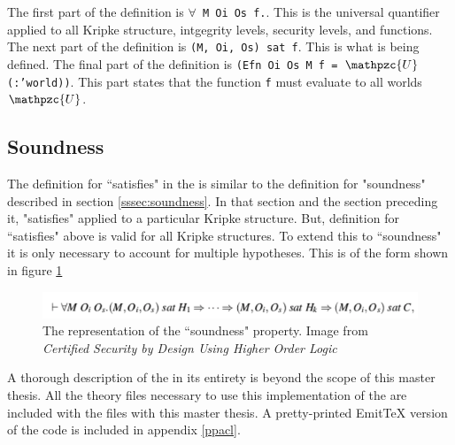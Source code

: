 \documentclass[../../main/main.tex]{subfiles}
\begin{document}
The first part of the definition is \texttt{$\forall$ M Oi Os f.}. This is the universal quantifier applied to all Kripke structure, intgegrity levels, security levels, and functions.  The next part of the definition is \texttt{(M, Oi, Os) sat f}.  This is what is being defined.  The final part of the definition is \texttt{(Efn Oi Os M f = $\mathpzc{U}$(:'world))}.  This part states that the function \texttt{f} must evaluate to all worlds $\mathpzc{U}$.

\subsection{Soundness}
The definition for ``satisfies" in the  is similar to the definition for "soundness" described in section \ref{sssec:soundness}.  In that section and the section preceding it, "satisfies" applied to a particular Kripke structure.  But, definition for ``satisfies" above is valid for all Kripke structures.  To extend this to ``soundness" it is only necessary to account for multiple hypotheses.  This is of the form shown in figure \ref{soundhol}


\begin{figure}[h]
\centering
\includegraphics[width=\textwidth]{../figures/soundhol}
\caption{\label{soundhol}The  representation of the ``soundness" property.  Image from  \textit{Certified Security by Design Using Higher Order Logic}\cite{certmanual}}
\end{figure}

A thorough description of the  in its entirety is beyond the scope of this master thesis.  All the theory files necessary to use this  implementation of the  are included with the files with this master thesis.  A pretty-printed EmitTeX version of the code is included in appendix \ref{ppacl}.  
\end{document}
